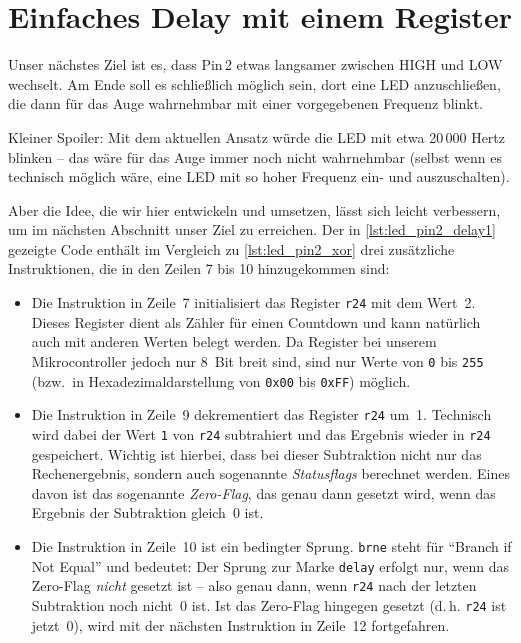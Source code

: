 \documentclass[a4paper,12pt]{article}
\begin{document}
\newpage
\section{Einfaches Delay mit einem Register}

Unser nächstes Ziel ist es, dass Pin 2 etwas langsamer zwischen HIGH und LOW
wechselt. Am Ende soll es schließlich möglich sein, dort eine LED
anzuschließen, die dann für das Auge wahrnehmbar mit einer vorgegebenen
Frequenz blinkt. 

Kleiner Spoiler: Mit dem aktuellen Ansatz würde die LED mit etwa 20 000 Hertz
blinken – das wäre für das Auge immer noch nicht wahrnehmbar (selbst wenn es
technisch möglich wäre, eine LED mit so hoher Frequenz ein- und auszuschalten). 

Aber die Idee, die wir hier entwickeln und umsetzen, lässt sich leicht
verbessern, um im nächsten Abschnitt unser Ziel zu erreichen.
Der in \autoref{lst:led_pin2_delay1} gezeigte Code enthält im Vergleich zu
\autoref{lst:led_pin2_xor} drei zusätzliche Instruktionen, die in den Zeilen 7
bis 10 hinzugekommen sind:

\begin{itemize}
    \item
	Die Instruktion in Zeile~7 initialisiert das Register \texttt{r24} mit
	dem Wert~2. Dieses Register dient als Zähler für einen Countdown und
	kann natürlich auch mit anderen Werten belegt werden. Da Register bei
	unserem Mikrocontroller jedoch nur 8~Bit breit sind, sind nur Werte von
	\texttt{0} bis \texttt{255} (bzw.\ in Hexadezimaldarstellung von
	\texttt{0x00} bis \texttt{0xFF}) möglich.
  
    \item
	Die Instruktion in Zeile~9 dekrementiert das Register \texttt{r24}
	um~1. Technisch wird dabei der Wert \texttt{1} von \texttt{r24}
	subtrahiert und das Ergebnis wieder in \texttt{r24} gespeichert.
	Wichtig ist hierbei, dass bei dieser Subtraktion nicht nur das
	Rechenergebnis, sondern auch sogenannte \emph{Statusflags} berechnet
	werden. Eines davon ist das sogenannte \emph{Zero-Flag}, das genau dann
	gesetzt wird, wenn das Ergebnis der Subtraktion gleich~0 ist.
  
    \item
	Die Instruktion in Zeile~10 ist ein bedingter Sprung. \texttt{brne}
	steht für \enquote{Branch if Not Equal} und bedeutet: Der Sprung zur
	Marke \texttt{delay} erfolgt nur, wenn das Zero-Flag \emph{nicht}
	gesetzt ist – also genau dann, wenn \texttt{r24} nach der letzten
	Subtraktion noch nicht~0 ist. Ist das Zero-Flag hingegen gesetzt
	(d.\,h. \texttt{r24} ist jetzt~0), wird mit der nächsten Instruktion in
	Zeile~12 fortgefahren.
\end{itemize}
\end{document}
